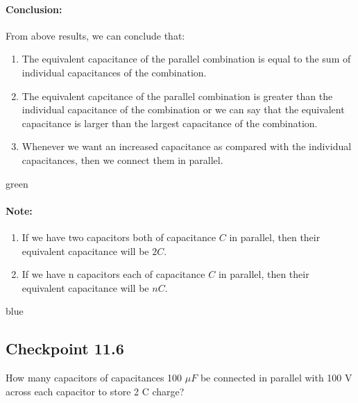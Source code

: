 \paragraph{Conclusion:}
From above results, we can conclude that:
\begin{enumerate}[label = (\roman*)]
\item The equivalent capacitance of the parallel combination is
equal to the sum of individual capacitances of the combination.
\item The equivalent capcitance of the parallel combination is
greater than the individual capacitance of the combination or
we can say that the equivalent capacitance is larger than the
largest capacitance of the combination.
\item Whenever we want an increased capacitance as compared with the
individual capacitances,
then we connect them in parallel.
\end{enumerate}
\begin{mybox}{green}{}
  \paragraph*{\note{}Note:}
  \begin{enumerate}[label = (\roman*)]
  \item If we have two capacitors both of capacitance $C$ in parallel,
  then their equivalent capacitance will be $2C$.
  \item If we have n capacitors each of capacitance $C$ in parallel,
  then their equivalent capacitance will be $nC$.
  \end{enumerate}
\end{mybox}
\begin{mybox}{blue}{}
\subsection*{\checkpoint{} Checkpoint 11.6}
How many capacitors of capacitances 100 $\mu F$ be connected in
parallel with 100 V across each capacitor to store 2 C charge?
\end{mybox}
